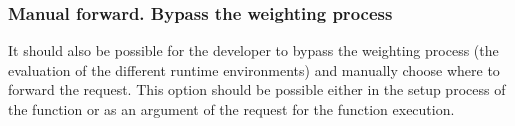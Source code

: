 \documentclass[conference]{IEEEtran}
\begin{document}
\subsubsection{Manual forward. Bypass the weighting process}
\label{usecases:manual_forward}

It should also be possible for the developer to bypass the weighting process (the
evaluation of the different runtime environments) and manually choose where to forward the
request. This option should be possible either in the setup process of the
function or as an argument of the request for the function execution. 


\end{document}
